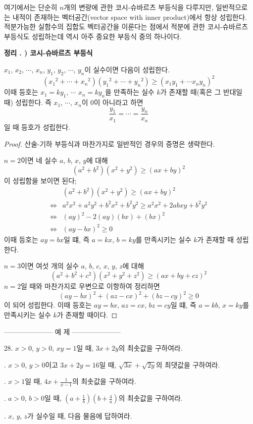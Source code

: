 \documentclass{article}
\newcounter{num}[section]
\newcommand{\theo}[1]
{\bigskip\noindent\refstepcounter{num}\textbf{정리 \arabic{section}. \arabic{num}) #1}\par}
\begin{document}
여기에서는 단순히 \(n\)개의 변량에 관한 코시-슈바르츠 부등식을 다루지만, 일반적으로는 내적이 존재하는 벡터공간(vector space with inner product)에서 항상 성립한다.
적분가능한 실함수의 집합도 벡터공간을 이룬다는 점에서 적분에 관한 코시-슈바르츠 부등식도 성립하는데 역시 아주 중요한 부등식 중의 하나이다.

\theo{코시-슈바르츠 부등식}
\(x_1\), \(x_2\), \(\cdots\), \(x_n\), \(y_1\), \(y_2\), \(\cdots\), \(y_n\)이 실수이면 다음이 성립한다.
\[
({x_1}^2+\cdots+{x_n}^2)({y_1}^2+\cdots+{y_n}^2)\ge(x_1y_1+\cdots x_ny_n)^2
\]
이때 등호는 \(x_1=ky_1\), \(\cdots\) \(x_n=ky_n\)을 만족하는 실수 \(k\)가 존재할 때(혹은 그 반대일 때) 성립한다.
즉 \(x_1\), \(\cdots\), \(x_n\)이 0이 아니라고 하면
\[\frac{y_1}{x_1}=\cdots=\frac{y_n}{x_n}\]
일 때 등호가 성립한다.
\begin{proof}
산술-기하 부등식과 마찬가지로 일반적인 경우의 증명은 생략한다.

\(n=2\)이면 네 실수 \(a\), \(b\), \(x\), \(y\)에 대해
\[(a^2+b^2)(x^2+y^2)\ge(ax+by)^2\]
이 성립함을 보이면 된다;
\begin{align*}
&(a^2+b^2)(x^2+y^2)\ge(ax+by)^2\\
\iff&a^2x^2+a^2y^2+b^2x^2+b^2y^2\ge a^2x^2+2abxy+b^2y^2\\
\iff&(ay)^2-2(ay)(bx)+(bx)^2\\
\iff&(ay-bx)^2\ge0
\end{align*}
이때 등호는 \(ay=bx\)일 떄, 즉 \(a=kx\), \(b=ky\)를 만족시키는 실수 \(k\)가 존재할 때 성립한다.

\(n=3\)이면 여섯 개의 실수 \(a\), \(b\), \(c\), \(x\), \(y\), \(z\)에 대해
\[(a^2+b^2+c^2)(x^2+y^2+z^2)\ge(ax+by+cz)^2\]
\(n=2\)일 때와 마찬가지로 우변으로 이항하여 정리하면
\[(ay-bx)^2+(az-cx)^2+(bz-cy)^2\ge0\]
이 되어 성립한다.
이때 등호는 \(ay=bx\), \(az=cx\), \(bz=cy\)일 떄, 즉 \(a=kb\), \(x=ky\)를 만족시키는 실수 \(k\)가 존재할 때이다.
\end{proof}

--------------------- 예 제 ---------------------

28.
\(x>0\), \(y>0\), \(xy=1\)일 때, \(3x+2y\)의 최솟값을 구하여라.

.
\(x>0\), \(y>0\)이고 \(3x+2y=16\)일 때, \(\sqrt{3x}+\sqrt{2y}\)의 최댓값을 구하여라.

.
\(x>1\)일 때, \(4x+\frac1{x-1}\)의 최솟값을 구하여라.

.
\(a>0\), \(b>0\)일 때, \((a+\frac1b)(b+\frac4a)\)의 최솟값을 구하여라.

.
\(x\), \(y\), \(z\)가 실수일 때, 다음 물음에 답하여라.
\end{document}
